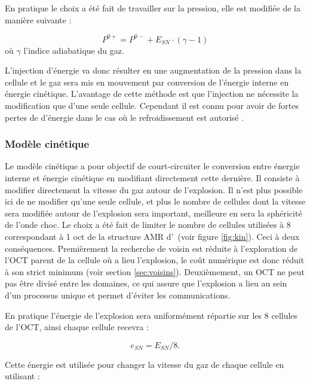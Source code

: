 En pratique le choix a été fait de travailler sur la pression, elle est modifiée de la manière suivante :

\begin{equation}
P^{0+} = P^{0-}  + E_{SN} \cdot  (\gamma-1)
\end{equation}
où $\gamma$ l'indice adiabatique du gaz.

L'injection d'énergie va donc résulter en une augmentation de la pression dans la cellule et le gaz sera mis en mouvement par conversion de l'énergie interne en énergie cinétique. 
L'avantage de cette méthode est que l'injection ne nécessite la modification que d'une seule cellule.
Cependant il est connu pour avoir de fortes pertes de d'énergie dans le cas où le refroidissement est autorisé \citep{navarro_simulations_1993}. 

\subsubsection{Modèle cinétique}

Le modèle cinétique a pour objectif de court-circuiter le conversion entre énergie interne et énergie cinétique en modifiant directement cette dernière.
Il consiste à modifier directement la vitesse du gaz autour de l'explosion. %
Il n'est plus possible ici de ne modifier qu'une seule cellule, et plus le nombre de cellules dont la vitesse sera modifiée autour de l'explosion sera important, meilleure en sera la sphéricité de l'onde choc.
Le choix a été fait de limiter le nombre de cellules utilisées à 8 correspondant à 1 oct de la structure \ac{AMR} d'\emma\ (voir figure \ref{fig:kin}).
Ceci à deux conséquences.
Premièrement la recherche de voisin est réduite à l'exploration de l'OCT parent de la cellule où a lieu l'explosion, le coût numérique est donc réduit à son strict minimum (voir section \ref{sec:voisins}).
Deuxièmement, un OCT ne peut pas être divisé entre les domaines, ce qui assure que l'explosion a lieu au sein d'un processus unique et permet d'éviter les communications.

En pratique l'énergie de l'explosion sera uniformément répartie sur les 8 cellules de l'OCT, ainsi chaque cellule recevra : 

\begin{equation}
e_{SN} = E_{SN}/8.
\end{equation}

Cette énergie est utilisée pour changer la vitesse du gaz de chaque cellule en utilisant : 

